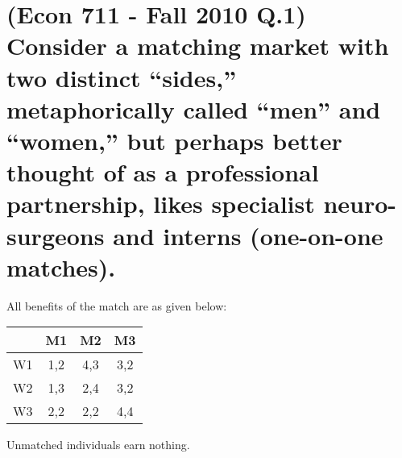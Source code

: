 \documentclass[]{article}
\begin{document}
\section{(Econ 711 - Fall 2010 Q.1) Consider a matching market with two distinct “sides,” metaphorically  called  “men”  and  “women,”  but  perhaps  better  thought  of  as  a professional  partnership, likes specialist  neuro-surgeons  and  interns (one-on-one matches). } All benefits of the match are as given below:

\begin{center}
\begin{tabular}{|c|c|c|c|}
\hline 
      & M1 & M2 & M3 \\ 
\hline 
W1 & 1,2 & 4,3 & 3,2 \\ 
\hline 
W2 & 1,3 & 2,4 & 3,2 \\ 
\hline 
W3 & 2,2 & 2,2 & 4,4 \\ 
\hline 
\end{tabular} 
\end{center}

Unmatched individuals earn nothing. 
\end{document}
